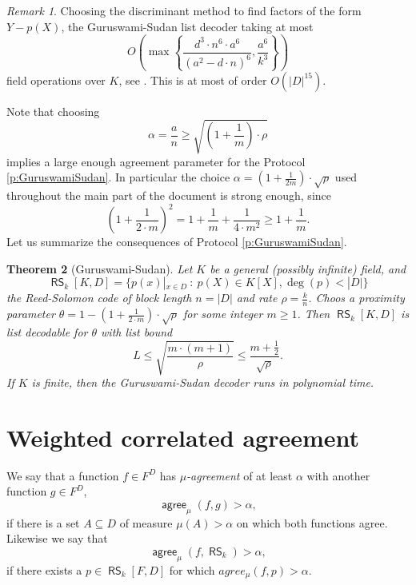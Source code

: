 \documentclass[11pt,article,oneside]{memoir}
\newtheorem{thm}{Theorem}[]
\theoremstyle{definition}
\theoremstyle{remark}
\newtheorem{rem}[thm]{Remark}
\DeclareMathOperator{\RS}{\mathsf{RS}}
\DeclareMathOperator{\agree}{\mathsf{agree}}
\begin{document}
\begin{rem}
\label{rem:GuruswamiSudanTime}
Choosing the discriminant method to find factors of the form $Y- p(X)$, the Guruswami-Sudan list decoder taking at most
\[
O\left(\max\left\{\frac{d^3 \cdot n^6 \cdot a^6}{(a^2 - d\cdot n)^6}, \frac{a^6}{k^3}\right\}\right)
\]
field operations over $K$, see \cite{GuruswamiSudan}.
This is at most of order $O\left(|D|^{15}\right)$.
\end{rem}

Note that choosing 
\[
\alpha = \frac{a}{n}\geq \sqrt{\left(1+\frac{1}{m}\right)\cdot \rho}
\] 
implies a large enough agreement parameter for the Protocol \ref{p:GuruswamiSudan}.
In particular the choice $\alpha =\left(1+\frac{1}{2m}\right)\cdot\sqrt\rho$ used throughout the main part of the document is strong enough, since
\[
\left(1+\frac{1}{2\cdot m}\right)^2 = 1 + \frac{1}{m} +\frac{1}{4\cdot m^2} \geq 1+ \frac{1}{m}.
\]
Let us summarize the consequences of Protocol \ref{p:GuruswamiSudan}.

\begin{thm}[Guruswami-Sudan] 
Let $K$ be a general (possibly infinite) field, and
\[
\RS_k[K,D]= \big\{ p(x)|_{x\in D}\: : \: p(X)\in K[X], \deg(p) < |D| \big\}
\] 
the Reed-Solomon code of block length $n=|D|$ and rate $\rho=\frac{k}{n}$. 
Choos a proximity parameter $\theta =1- \left(1+\frac{1}{2\cdot m}\right)\cdot \sqrt{\rho}$ for some integer $m\geq 1$. 
Then $\RS_k[K,D]$ is list decodable for $\theta$ with list bound
\begin{equation}
\label{e:GuruswamiSudanListBound}
L \leq \sqrt{\frac{m\cdot (m+1)}{\rho}} \leq \frac{m+\frac{1}{2}}{\sqrt\rho}.
\end{equation}
If $K$ is finite, then the Guruswami-Sudan decoder runs in polynomial time.
\end{thm}


\section{Weighted correlated agreement}
\label{s:WeigthedCorrelatedAgreement}


We say that a function $f\in F^D$ has \textit{$\mu$-agreement} of at least $\alpha$ with another function $g\in F^D$,
\[ 
\agree_\mu(f, g)>\alpha,
\]
if there is a set $A\subseteq D$ of measure $\mu(A)>\alpha$ on which both functions agree. 
Likewise we say that 
\[
\agree_\mu(f, \RS_k) > \alpha,
\] 
if there exists a $p \in \RS_k[F,D]$ for which $agree_\mu(f,p)>\alpha$.
\end{document}

